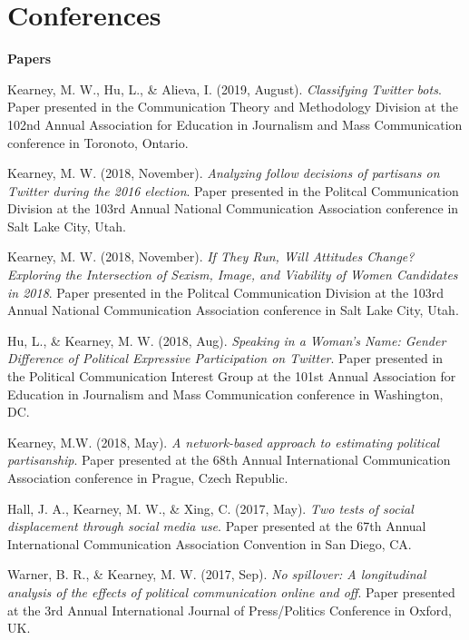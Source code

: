 \section{Conferences}

{\large\textbf{Papers}} \vspace{.5em}
  \begin{bibenum}
    \item[] Kearney, M. W., Hu, L., \& Alieva, I. (2019, August).
      \textit{Classifying Twitter bots}.
      Paper presented in the Communication Theory and Methodology Division at the 102nd Annual Association for Education in Journalism and Mass Communication conference in Toronoto, Ontario.
    \item[] Kearney, M. W. (2018, November).
      \textit{Analyzing follow decisions of partisans on Twitter during the 2016 election}.
      Paper presented in the Politcal Communication Division at the 103rd Annual National Communication Association conference in Salt Lake City, Utah.
    \item[] Kearney, M. W. (2018, November).
      \textit{If They Run, Will Attitudes Change? Exploring the Intersection of Sexism, Image, and Viability of Women Candidates in 2018}.
      Paper presented in the Politcal Communication Division at the 103rd Annual National Communication Association conference in Salt Lake City, Utah.
    \item[] Hu, L., \& Kearney, M. W. (2018, Aug).
      \textit{Speaking in a Woman's Name: Gender Difference of Political Expressive Participation on Twitter}.
      Paper presented in the Political Communication Interest Group at the 101st Annual Association for Education in Journalism and Mass Communication conference in Washington, DC.
    \item[] Kearney, M.W. (2018, May).
      \textit{A network-based approach to estimating political partisanship}.
      Paper presented at the 68th Annual International Communication Association conference in Prague, Czech Republic.
    \item[] Hall, J. A., Kearney, M. W., \& Xing, C. (2017, May).
      \textit{Two tests of social displacement through social media use}.
      Paper presented at the 67th Annual International Communication Association Convention in San Diego, CA.
    \item[] Warner, B. R., \& Kearney, M. W. (2017, Sep).
      \textit{No spillover: A longitudinal analysis of the effects of political communication online and off}.
      Paper presented at the 3rd Annual International Journal of Press/Politics Conference in Oxford, UK.

\end{bibenum}
